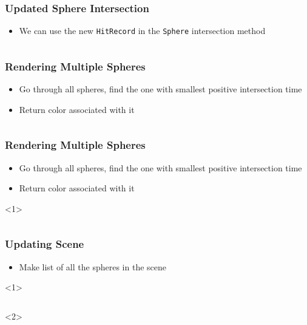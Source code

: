 \documentclass{beamer}
\begin{document}
\begin{frame}[fragile]
	\frametitle{Updated Sphere Intersection}
	\begin{itemize}
		\item We can use the new \texttt{HitRecord} in the \texttt{Sphere} intersection method
	\end{itemize}
	\inputminted[fontsize=\small]{python}{scripts/updatedSphereIntersection.py}
\end{frame}

\begin{frame}[fragile]
	\frametitle{Rendering Multiple Spheres}
	\begin{itemize}
		\item Go through all spheres, find the one with smallest positive intersection time
		\item Return color associated with it
	\end{itemize}
	\inputminted[fontsize=\small]{python}{scripts/multipleSpheres.py}
\end{frame}

\begin{frame}[fragile]
	\frametitle{Rendering Multiple Spheres}
	\begin{itemize}
		\item Go through all spheres, find the one with smallest positive intersection time
		\item Return color associated with it
	\end{itemize}
	\begin{onlyenv}
		\inputminted[fontsize=\small]{python}{scripts/multipleSpheres2.py}
	\end{onlyenv}
\end{frame}

\begin{frame}[fragile]
	\frametitle{Updating Scene}
	\begin{itemize}
		\item Make list of all the spheres in the scene
	\end{itemize}
	\begin{onlyenv}
		\inputminted{python}{scripts/multipleLoop.py}
	\end{onlyenv}
\end{frame}
\end{document}
